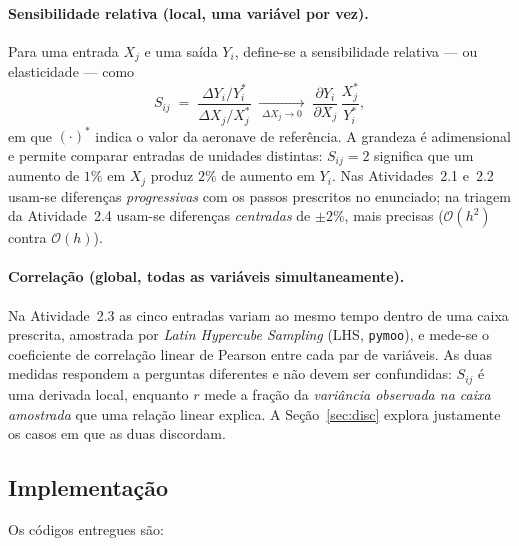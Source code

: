 \documentclass[11pt,a4paper]{article}
\newcommand{\code}[1]{\texttt{\small #1}}
\begin{document}
\paragraph{Sensibilidade relativa (local, uma vari\'avel por vez).}
Para uma entrada $X_j$ e uma sa\'ida $Y_i$, define-se a sensibilidade relativa
--- ou elasticidade --- como
\begin{equation}
S_{ij} \;=\;
\frac{\Delta Y_i / Y_i^{*}}{\Delta X_j / X_j^{*}}
\;\xrightarrow[\;\Delta X_j \to 0\;]{}\;
\frac{\partial Y_i}{\partial X_j}\,\frac{X_j^{*}}{Y_i^{*}},
\label{eq:sens}
\end{equation}
em que $(\cdot)^{*}$ indica o valor da aeronave de refer\^encia. A grandeza \'e
adimensional e permite comparar entradas de unidades distintas: $S_{ij} = 2$
significa que um aumento de $1\%$ em $X_j$ produz $2\%$ de aumento em $Y_i$.
Nas Atividades~2.1 e~2.2 usam-se diferen\c{c}as \emph{progressivas} com os
passos prescritos no enunciado; na triagem da Atividade~2.4 usam-se
diferen\c{c}as \emph{centradas} de $\pm 2\%$, mais precisas
($\mathcal{O}(h^2)$ contra $\mathcal{O}(h)$).

\paragraph{Correla\c{c}\~ao (global, todas as vari\'aveis simultaneamente).}
Na Atividade~2.3 as cinco entradas variam ao mesmo tempo dentro de uma caixa
prescrita, amostrada por \emph{Latin Hypercube Sampling} (LHS, \code{pymoo}),
e mede-se o coeficiente de correla\c{c}\~ao linear de Pearson entre cada par de
vari\'aveis. As duas medidas respondem a perguntas diferentes e n\~ao devem
ser confundidas: $S_{ij}$ \'e uma derivada local, enquanto $r$ mede a
fra\c{c}\~ao da \emph{vari\^ancia observada na caixa amostrada} que uma
rela\c{c}\~ao linear explica. A Se\c{c}\~ao~\ref{sec:disc} explora
justamente os casos em que as duas discordam.

\subsection{Implementa\c{c}\~ao}

Os c\'odigos entregues s\~ao:
\end{document}
